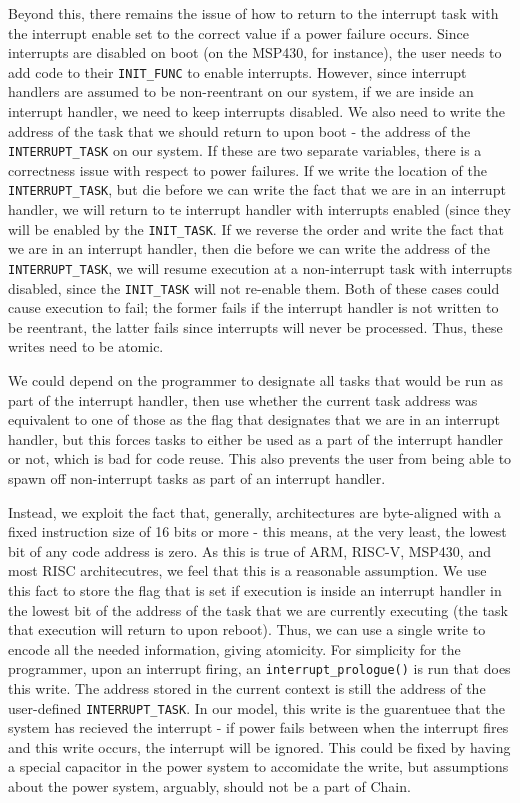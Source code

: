 \documentclass[11pt]{sensys-proc}
\newcommand{\chain}{Chain\xspace}
\begin{document}
Beyond this, there remains the issue of how to return to the interrupt task
with the interrupt enable set to the correct value if a power failure occurs.
Since interrupts are disabled on boot (on the MSP430, for instance), the user
needs to add code to their \texttt{INIT\_FUNC} to enable interrupts. However,
since interrupt handlers are assumed to be non-reentrant on our system, if
we are inside an interrupt handler, we need to keep interrupts disabled. We
also need to write the address of the task that we should return to upon boot -
the address of the \texttt{INTERRUPT\_TASK} on our system. If these are two
separate variables, there is a correctness issue with respect to power
failures. If we write the location of the \texttt{INTERRUPT\_TASK}, but die
before we can write the fact that we are in an interrupt handler, we will
return to te interrupt handler with interrupts enabled (since they will be
enabled by the \texttt{INIT\_TASK}. If we reverse the order and write the fact
that we are in an interrupt handler, then die before we can write the address
of the \texttt{INTERRUPT\_TASK}, we will resume execution at a non-interrupt
task with interrupts disabled, since the \texttt{INIT\_TASK} will not re-enable
them. Both of these cases could cause execution to fail; the former fails if
the interrupt handler is not written to be reentrant, the latter fails since
interrupts will never be processed. Thus, these writes need to be atomic.


We could depend on the programmer to designate all tasks that would be run as
part of the interrupt handler, then use whether the current task address was
equivalent to one of those as the flag that designates that we are in an
interrupt handler, but this forces tasks to either be used as a part of the
interrupt handler or not, which is bad for code reuse. This also prevents the
user from being able to spawn off non-interrupt tasks as part of an interrupt
handler.


Instead, we exploit the fact that, generally, architectures are byte-aligned
with a fixed instruction size of 16 bits or more - this means, at the very
least, the lowest bit of any code address is zero. As this is true of ARM,
RISC-V, MSP430, and most RISC architecutres, we feel that this is a reasonable
assumption. We use this fact to store the flag that is set if execution is
inside an interrupt handler in the lowest bit of the address of the task that
we are currently executing (the task that execution will return to upon
reboot). Thus, we can use a single write to encode all the needed information,
giving atomicity. For simplicity for the programmer, upon an interrupt firing,
an \texttt{interrupt\_prologue()} is run that does this write. The address stored
in the current context is still the address of the user-defined
\texttt{INTERRUPT\_TASK}. In our model, this write is the guarentuee that the
system has recieved the interrupt - if power fails between when the interrupt
fires and this write occurs, the interrupt will be ignored. This could be fixed
by having a special capacitor in the power system to accomidate the write, but
assumptions about the power system, arguably, should not be a part of \chain.
\end{document}
